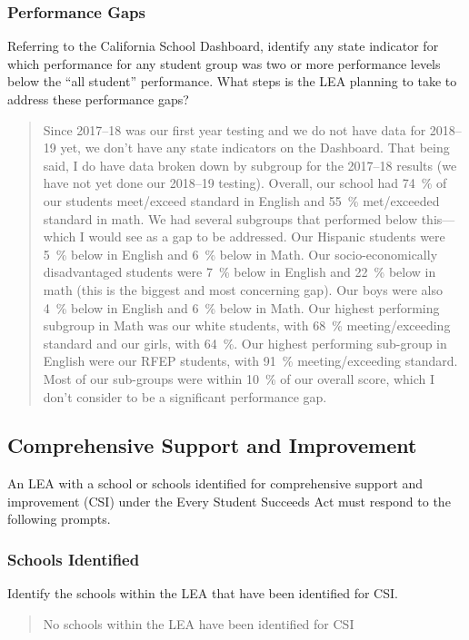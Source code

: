 \documentclass{article}
\begin{document}
\subsubsection{Performance Gaps}
Referring to the California School Dashboard, identify any state indicator for which performance for any student group was two or more performance levels below the ``all student'' performance. What steps is the LEA planning to take to address these performance gaps?
\begin{quotation}
	Since 2017--18 was our first year testing and we do not have data for 2018--19 yet, we don't have any state indicators on the Dashboard. That being said, I do have data broken down by subgroup for the 2017--18 results (we have not yet done our 2018--19 testing). Overall, our school had \SI{74}{\percent} of our students meet/exceed standard in English and \SI{55}{\percent} met/exceeded standard in math. We had several subgroups that performed below this---which I would see as a gap to be addressed. Our Hispanic students were \SI{5}{\percent} below in English and \SI{6}{\percent} below in Math. Our socio-economically disadvantaged students were \SI{7}{\percent} below in English and \SI{22}{\percent} below in math (this is the biggest and most concerning gap). Our boys were also \SI{4}{\percent} below in English and \SI{6}{\percent} below in Math. Our highest performing subgroup in Math was our white students, with \SI{68}{\percent} meeting/exceeding standard and our girls, with \SI{64}{\percent}. Our highest performing sub-group in English were our RFEP students, with \SI{91}{\percent} meeting/exceeding standard. Most of our sub-groups were within \SI{10}{\percent} of our overall score, which I don't consider to be a significant performance gap.
\end{quotation}

\subsection{Comprehensive Support and Improvement}
An LEA with a school or schools identified for comprehensive support and improvement (CSI) under the Every Student Succeeds Act must respond to the following prompts.

\subsubsection{Schools Identified}
Identify the schools within the LEA that have been identified for CSI.
\begin{quote}
	No schools within the LEA have been identified for CSI
\end{quote}
\end{document}
